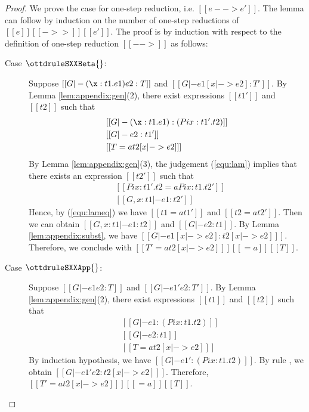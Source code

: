 \begin{proof}
    We prove the case for one-step reduction, i.e. $[[e --> e']]$. The lemma can follow by induction on the number of one-step reductions of $[[e]] [[->>]] [[e']]$.
    The proof is by induction with respect to the definition of one-step reduction $[[-->]]$ as follows:
    \begin{description}
        \item[Case $\ottdruleSXXBeta{}$:] $\quad$ \\
        Suppose $[[G |- (\x:t1.e1)e2 :T]]$ and $[[G |- e1 [x |-> e2] :T']]$. By Lemma \ref{lem:appendix:gen}(2), there exist expressions $[[t1']]$ and $[[t2]]$ such that 
        \begin{align}
            &[[G |- (\x:t1.e1):(Pi x:t1'.t2)]] \label{equ:lam} \\
            &[[G |- e2:t1']] \nonumber \\
            &[[T =a t2 [x |-> e2] ]] \nonumber
        \end{align}
        By Lemma \ref{lem:appendix:gen}(3), the judgement (\ref{equ:lam}) implies that there exists an expression $[[t2']]$ such that
        \begin{align}
            &[[Pi x:t1'.t2 =a Pi x:t1.t2']] \label{equ:lameq}\\
            &[[G, x:t1 |- e1:t2']] \nonumber
        \end{align}
        Hence, by (\ref{equ:lameq}) we have $[[t1 =a t1']]$ and $[[t2 =a t2']]$. Then we can obtain $[[G, x:t1 |- e1:t2]]$ and $[[G |- e2:t1]]$. By Lemma \ref{lem:appendix:subst}, we have $[[G |- e1[x |-> e2] : t2[x |-> e2] ]]$. Therefore, we conclude with $[[T' =a t2[x |-> e2] ]] [[=a]] [[T]]$.
        
        \item[Case $\ottdruleSXXApp{}$:] $\quad$ \\
        Suppose $[[G |- e1 e2 :T]]$ and $[[G |- e1' e2 :T']]$. By Lemma \ref{lem:appendix:gen}(2), there exist expressions $[[t1]]$ and $[[t2]]$ such that 
        \begin{align*}
            &[[G |- e1:(Pi x:t1.t2)]] \\
            &[[G |- e2:t1]]\\
            &[[T =a t2 [x |-> e2] ]]
        \end{align*}
        By induction hypothesis, we have $[[G |- e1':(Pi x:t1.t2)]]$. By rule , we obtain $[[G |- e1' e2 : t2[x |-> e2] ]]$. Therefore, $[[T' =a t2[x |-> e2] ]] [[=a]] [[T]]$.
        

\end{description}
\end{proof}

